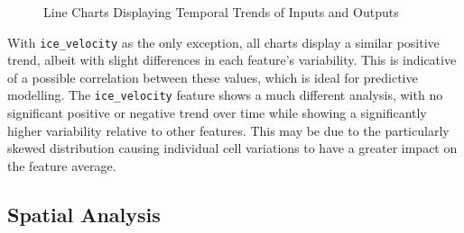 \begin{figure}[H]
  \centering
  \caption{Line Charts Displaying Temporal Trends of Inputs and Outputs}
  \label{fig:linecharts}
\end{figure}

With \texttt{ice\_velocity} as the only exception, all charts display a similar positive trend, albeit with slight differences in each feature's variability. This is indicative of a possible correlation between these values, which is ideal for predictive modelling. The \texttt{ice\_velocity} feature shows a much different analysis, with no significant positive or negative trend over time while showing a significantly higher variability relative to other features. This may be due to the particularly skewed distribution causing individual cell variations to have a greater impact on the feature average.

\subsection{Spatial Analysis}\label{SS:spatial_analysis}


